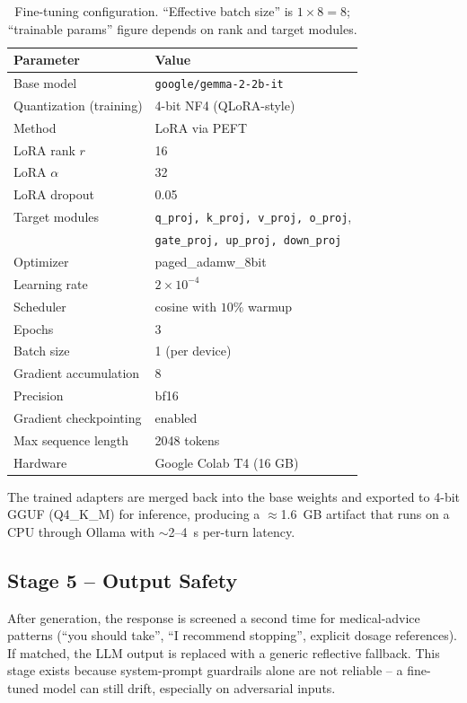 \begin{table}[h]
\centering
\caption{Fine-tuning configuration. ``Effective batch size'' is
$1 \times 8 = 8$; ``trainable params'' figure depends on rank and target modules.}
\label{tab:finetune-config}
\begin{tabular}{ll}
\toprule
\textbf{Parameter} & \textbf{Value} \\
\midrule
Base model              & \texttt{google/gemma-2-2b-it} \\
Quantization (training) & 4-bit NF4 (QLoRA-style) \\
Method                  & LoRA via PEFT \\
LoRA rank $r$           & 16 \\
LoRA $\alpha$           & 32 \\
LoRA dropout            & 0.05 \\
Target modules          & \texttt{q\_proj, k\_proj, v\_proj, o\_proj}, \\
                        & \texttt{gate\_proj, up\_proj, down\_proj} \\
Optimizer               & paged\_adamw\_8bit \\
Learning rate           & $2 \times 10^{-4}$ \\
Scheduler               & cosine with $10\%$ warmup \\
Epochs                  & 3 \\
Batch size              & 1 (per device) \\
Gradient accumulation   & 8 \\
Precision               & bf16 \\
Gradient checkpointing  & enabled \\
Max sequence length     & 2048 tokens \\
Hardware                & Google Colab T4 (16 GB) \\
\bottomrule
\end{tabular}
\end{table}

The trained adapters are merged back into the base weights and exported to
4-bit GGUF (Q4\_K\_M) for inference, producing a $\approx$1.6~GB artifact that
runs on a CPU through Ollama with $\sim$2--4~s per-turn latency.

\subsection{Stage 5 -- Output Safety}

After generation, the response is screened a second time for medical-advice
patterns (``you should take'', ``I recommend stopping'', explicit dosage
references). If matched, the LLM output is replaced with a generic reflective
fallback. This stage exists because system-prompt guardrails alone are not
reliable -- a fine-tuned model can still drift, especially on adversarial
inputs.

